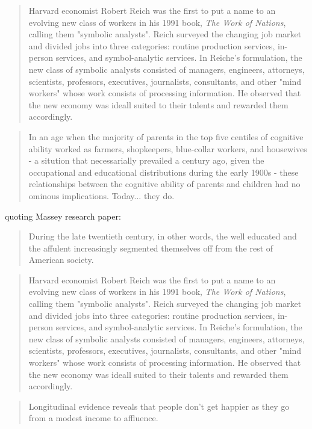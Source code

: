 \begin{quote}
  Harvard economist Robert Reich was the first to put a name to an evolving new class of workers in his 1991 book, \textit{The Work of Nations}, calling them "symbolic analysts". Reich surveyed the changing job market and divided jobs into three categories: routine production services, in-person services, and symbol-analytic services. In Reiche's formulation, the new class of symbolic analysts consisted of managers, engineers, attorneys, scientists, professors, executives, journalists, consultants, and other "mind workers" whose work consists of processing information. He observed that the new economy was ideall suited to their talents and rewarded them accordingly.
\end{quote}

\begin{quote}
  In an age when the majority of parents in the top five centiles of cognitive ability worked as farmers, shopkeepers, blue-collar workers, and housewives - a sitution that necessarially prevailed a century ago, given the occupational and educational distributions during the early 1900s - these relationships between the cognitive ability of parents and children had no ominous implications. Today... they do.
\end{quote}


quoting Massey research paper:
\begin{quote}
  During the late twentieth century, in other words, the well educated and the affulent increasingly segmented themselves off from the rest of American society.
\end{quote}

\begin{quote}
  Harvard economist Robert Reich was the first to put a name to an evolving new class of workers in his 1991 book, \textit{The Work of Nations}, calling them "symbolic analysts". Reich surveyed the changing job market and divided jobs into three categories: routine production services, in-person services, and symbol-analytic services. In Reiche's formulation, the new class of symbolic analysts consisted of managers, engineers, attorneys, scientists, professors, executives, journalists, consultants, and other "mind workers" whose work consists of processing information. He observed that the new economy was ideall suited to their talents and rewarded them accordingly.
\end{quote}

\begin{quote}
  Longitudinal evidence reveals that people don't get happier as they go from a modest income to affluence.
\end{quote}